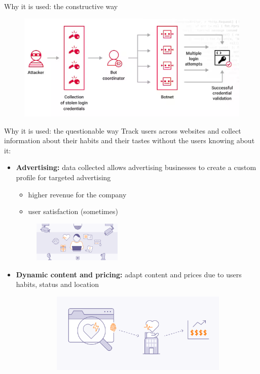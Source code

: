 \begin{frame}{Why it is used: the constructive way}
\begin{itemize}
          \begin{figure}
            \centering
            \includegraphics[width=0.6\linewidth]{images/botnet.png}
          \end{figure}
  \end{itemize}
\end{frame}

\begin{frame}{Why it is used: the questionable way}
  Track users across websites and collect information about their habits and their tastes without the users knowing about it:
  \begin{itemize}
    \item \textbf{Advertising:} data collected allows advertising businesses to create a custom profile for targeted advertising
          \begin{itemize}
            \item higher revenue for the company
            \item user satisfaction (sometimes)
          \end{itemize}
          \begin{figure}
            \centering
            \includegraphics[width=0.4\textwidth]{images/advertising.png}
          \end{figure}
    \item \textbf{Dynamic content and pricing:} adapt content and prices due to users habits, status and location
          \begin{figure}
            \centering
            \begin{subfigure}{0.45\textwidth}
              \includegraphics[width=\linewidth]{images/health.png}

\end{subfigure}
\end{figure}
\end{itemize}
\end{frame}
